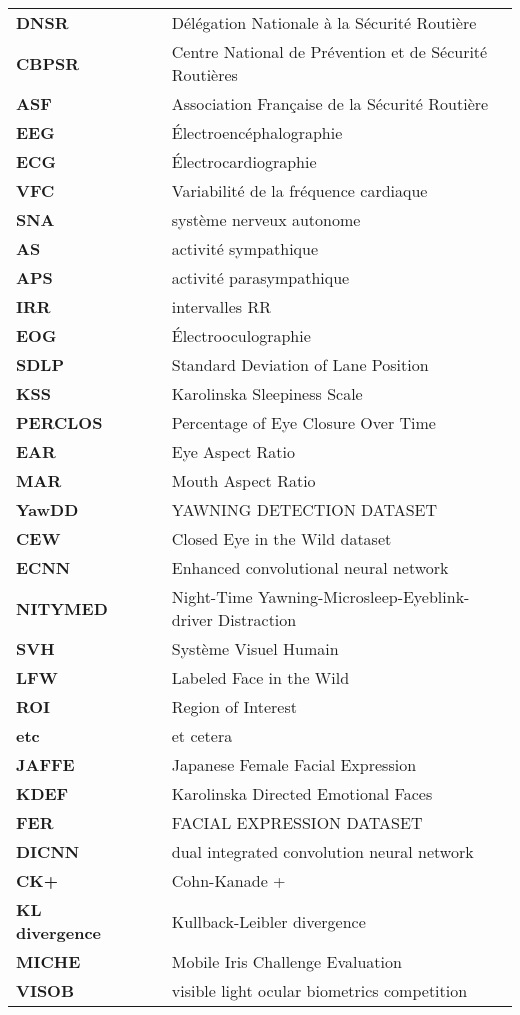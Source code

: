 \begin{tabular}{llll}
\textbf{DNSR} & & & Délégation Nationale à la Sécurité Routière\\
\textbf{CBPSR}& & & Centre National de Prévention et de Sécurité Routières\\
\textbf{ASF}& & & Association Française de la Sécurité Routière \\
\textbf{EEG}& & & Électroencéphalographie\\
\textbf{ECG}& & & Électrocardiographie \\
\textbf{VFC}& & & Variabilité de la fréquence cardiaque\\
\textbf{SNA}& & & système nerveux autonome\\
\textbf{AS}& & & activité sympathique\\
\textbf{APS}& & & activité parasympathique\\
\textbf{IRR}& & & intervalles RR\\
\textbf{EOG}& & & Électrooculographie  \\
\textbf{SDLP}& & & Standard Deviation of Lane Position\\
\textbf{KSS}& & & Karolinska Sleepiness Scale\\
\textbf{PERCLOS}& & & Percentage of Eye Closure Over Time\\
\textbf{EAR}& & & Eye Aspect Ratio\\
\textbf{MAR}& & & Mouth Aspect Ratio\\
\textbf{YawDD}& & & YAWNING DETECTION DATASET\\
\textbf{CEW}& & & Closed Eye in the Wild dataset\\
\textbf{ECNN}& & & Enhanced convolutional neural network\\
\textbf{NITYMED}& & & Night-Time Yawning-Microsleep-Eyeblink-driver Distraction\\
\textbf{SVH}& & & Système Visuel Humain\\
\textbf{LFW}& & & Labeled Face in the Wild \\
\textbf{ROI}& & & Region of Interest\\
\textbf{etc}& & & et cetera\\
\textbf{JAFFE}& & & Japanese Female Facial Expression\\
\textbf{KDEF}& & & Karolinska Directed Emotional Faces \\
\textbf{FER}& & & FACIAL EXPRESSION DATASET \\
\textbf{DICNN}& & & dual integrated convolution neural network\\
\textbf{CK+}& & & Cohn-Kanade +\\
\textbf{KL divergence}& & & Kullback-Leibler divergence\\
\textbf{MICHE}& & & Mobile Iris Challenge Evaluation\\
\textbf{VISOB}& & & visible light ocular biometrics competition \\


\end{tabular}